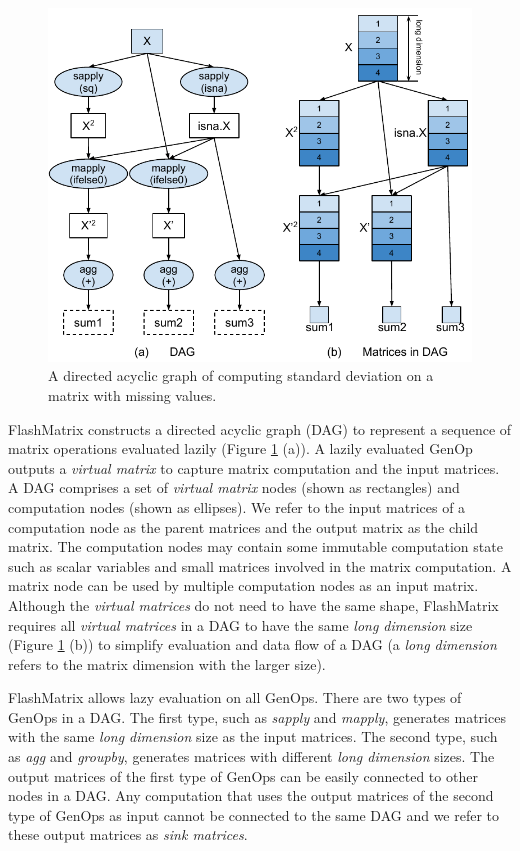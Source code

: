 \begin{figure}
	\centering
	\includegraphics[scale=0.7]{./sd.pdf}
	\caption{A directed acyclic graph of computing standard deviation on
	a matrix with missing values.}
	\label{fig:DAG}
\end{figure}

FlashMatrix constructs a directed acyclic graph (DAG) to represent a sequence
of matrix operations evaluated lazily (Figure \ref{fig:DAG} (a)). A lazily
evaluated GenOp outputs a \textit{virtual matrix} to capture matrix computation
and the input matrices. A
DAG comprises a set of \textit{virtual matrix} nodes (shown as rectangles)
and computation nodes (shown as ellipses). We refer to the input matrices of
a computation node as the parent matrices and the output matrix as the child matrix.
The computation nodes may contain some immutable computation state such as
scalar variables and small matrices involved in the matrix computation.
A matrix node can be used by multiple computation nodes as
an input matrix. Although the \textit{virtual matrices} do not need to have
the same shape, FlashMatrix requires all \textit{virtual matrices} in a DAG
to have the same \textit{long dimension} size (Figure \ref{fig:DAG} (b)) to
simplify evaluation and data flow of a DAG (a \textit{long dimension}
refers to the matrix dimension with the larger size).

FlashMatrix allows lazy evaluation on all GenOps. There are two types of GenOps
in a DAG. The first type, such as \textit{sapply} and \textit{mapply}, generates
matrices with the same \textit{long dimension} size as the input matrices.
The second type, such as \textit{agg} and \textit{groupby}, generates matrices
with different \textit{long dimension} sizes. The output matrices of the first
type of GenOps can be easily connected to other nodes in a DAG. Any computation
that uses the output matrices of the second type of GenOps as input cannot be
connected to the same DAG and we refer to these output matrices as
\textit{sink matrices}.

